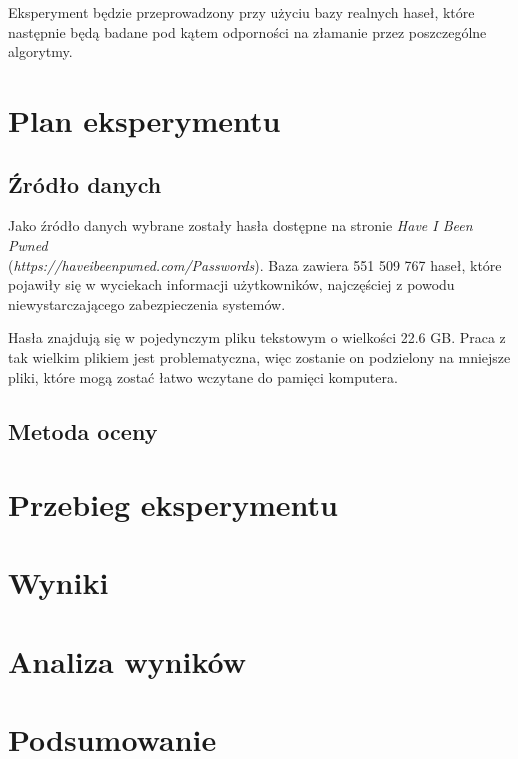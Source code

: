 \documentclass{article}
\begin{document}
Eksperyment będzie przeprowadzony przy użyciu bazy realnych haseł, które następnie będą badane pod kątem odporności na złamanie przez poszczególne algorytmy.

\section{Plan eksperymentu}
\subsection{Źródło danych}
Jako źródło danych wybrane zostały hasła dostępne na stronie \textit{Have I Been Pwned} \\ (\textit{https://haveibeenpwned.com/Passwords}). Baza zawiera 551 509 767 haseł, które pojawiły się w wyciekach informacji użytkowników, najczęściej z powodu niewystarczającego zabezpieczenia systemów. 

Hasła znajdują się w pojedynczym pliku tekstowym o wielkości 22.6 GB. Praca z tak wielkim plikiem jest problematyczna, więc zostanie on podzielony na mniejsze pliki, które mogą zostać łatwo wczytane do pamięci komputera.
\subsection{Metoda oceny}
\newpage
\section{Przebieg eksperymentu}

\newpage
\section{Wyniki}

\newpage
\section{Analiza wyników}

\newpage
\section{Podsumowanie}

\end{document}
